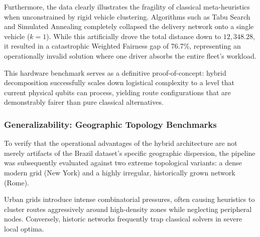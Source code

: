 \documentclass[a4paper]{report}
\begin{document}
{\begin{itemize}
\begin{itemize}
Furthermore, the data clearly illustrates the fragility of classical meta-heuristics when unconstrained by rigid vehicle clustering. Algorithms such as Tabu Search and Simulated Annealing completely collapsed the delivery network onto a single vehicle ($k=1$). While this artificially drove the total distance down to $12,348.28$, it resulted in a catastrophic Weighted Fairness gap of 76.7\%, representing an operationally invalid solution where one driver absorbs the entire fleet's workload. 

This hardware benchmark serves as a definitive proof-of-concept: hybrid decomposition successfully scales down logistical complexity to a level that current physical qubits can process, yielding route configurations that are demonstrably fairer than pure classical alternatives.

\subsubsection{Generalizability: Geographic Topology Benchmarks}

To verify that the operational advantages of the hybrid architecture are not merely artifacts of the Brazil dataset's specific geographic dispersion, the pipeline was subsequently evaluated against two extreme topological variants: a dense modern grid (New York) and a highly irregular, historically grown network (Rome). 

Urban grids introduce intense combinatorial pressures, often causing heuristics to cluster routes aggressively around high-density zones while neglecting peripheral nodes. Conversely, historic networks frequently trap classical solvers in severe local optima.


\end{itemize}
\end{itemize}}
\end{document}
